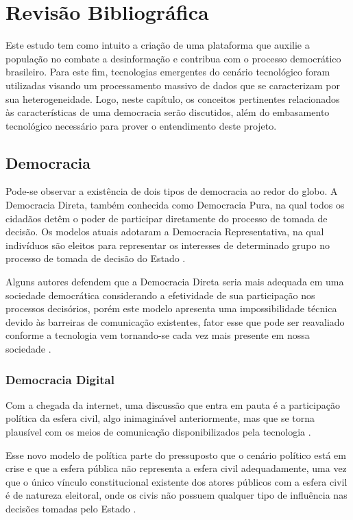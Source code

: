 \chapter{Revisão Bibliográfica}
\label{revisao}
Este estudo tem como intuito a criação de uma plataforma que auxilie a população no combate a desinformação e contribua com o processo democrático brasileiro. Para este fim, tecnologias emergentes do cenário tecnológico foram utilizadas visando um processamento massivo de dados que se caracterizam por sua heterogeneidade. Logo, neste capítulo, os conceitos pertinentes relacionados às características de uma democracia serão discutidos, além do embasamento tecnológico necessário para prover o entendimento deste projeto.

\section{Democracia} Pode-se observar a existência de dois tipos de democracia ao redor do globo. A Democracia Direta, também conhecida como Democracia Pura, na qual todos os cidadãos detêm o poder de participar diretamente do processo de tomada de decisão. Os modelos atuais adotaram a Democracia Representativa, na qual indivíduos são eleitos para representar os interesses de determinado grupo no processo de tomada de decisão do Estado \cite{impactofictonreiforcingcitizens}. 

Alguns autores defendem que a Democracia Direta seria mais adequada em uma sociedade democrática considerando a efetividade de sua participação nos processos decisórios, porém este modelo apresenta uma impossibilidade técnica devido às barreiras de comunicação existentes, fator esse que pode ser reavaliado conforme a tecnologia vem tornando-se cada vez mais presente em nossa sociedade \cite{impactofictonreiforcingcitizens}.

\subsection{Democracia Digital} Com a chegada da internet, uma discussão que entra em pauta é a participação política da esfera civil, algo inimaginável anteriormente, mas que se torna plausível com os meios de comunicação disponibilizados pela tecnologia \cite{democraciadigital}.

Esse novo modelo de política parte do pressuposto que o cenário político está em crise e que a esfera pública não representa a esfera civil adequadamente, uma vez que o único vínculo constitucional existente dos atores públicos com a esfera civil é de natureza eleitoral, onde os civis não possuem qualquer tipo de influência nas decisões tomadas pelo Estado \cite{democraciadigital}.

